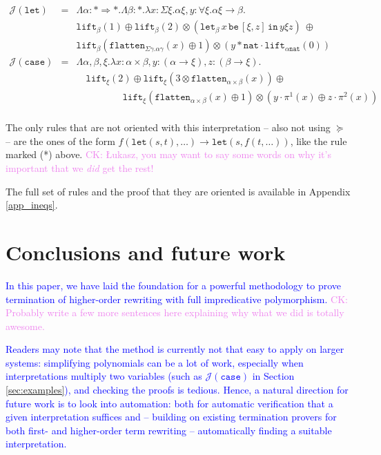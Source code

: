 \documentclass[a4paper,UKenglish,cleveref,autoref,numberwithinsect]{lipics-v2019}
\theoremstyle{definition}
\newcommand{\arrkind}{\Rightarrow}
\newcommand{\arrtype}{\rightarrow}
\newcommand{\quant}[2]{\forall #1.#2}
\newcommand{\red}{\longrightarrow}
\newcommand{\nat}{\mathtt{nat}}
\newcommand{\flatten}{\mathtt{flatten}}
\newcommand{\lift}{\mathtt{lift}}
\newcommand{\Termmap}{\mathcal{J}}
\newcommand{\xlet}[4]{\mathtt{let}_{#1}\,#2\,\mathtt{be}\,[#3]\,\mathtt{in}\,#4}
\newcommand{\CK}[1]{\textcolor{violet}{CK: #1}}
\newcommand{\CKchange}[1]{\textcolor{blue}{#1}}
\begin{document}
\[
\begin{array}{rcl}
\Termmap(\mathtt{let}) & = & \Lambda \alpha : * \arrkind * . \Lambda \beta : * . \lambda x : \Sigma \xi . \alpha\xi,
  y : \quant{\xi}{\alpha\xi \arrtype \beta}. \\
  & & \lift_\beta(1) \oplus \lift_\beta(2) \otimes
    (\xlet{\beta}{x}{\xi,z}{y\xi z})\ \oplus \\
  & & \lift_\beta(\flatten_{\Sigma\gamma.\alpha\gamma}(x) \oplus 1)
    \otimes (y * \nat \cdot \lift_{\alpha\nat}(0)) \\
\Termmap(\mathtt{case}) & = & \Lambda \alpha,\beta,\xi . \lambda x :
  \alpha \times \beta, y : (\alpha \arrtype \xi), z : (\beta \arrtype
  \xi). \\
  & & \quad
  \lift_\xi(2) \oplus
  \lift_\xi(3 \otimes \flatten_{\alpha \times \beta}(x)) \oplus \\
  & & \quad\phantom{ABCDE}
  \lift_\xi(\flatten_{\alpha \times \beta}(x) \oplus 1)
    \otimes (y \cdot \pi^1(x) \oplus z \cdot \pi^2(x)) \\
\end{array}
\]

The only rules that are not oriented with this interpretation -- also
not using $\succeq$ -- are the ones of the form $f(\mathtt{let}(s,t),
\dots) \red \mathtt{let}(s,f(t,\dots))$, like the rule marked (*) above.
\CK{\L ukasz, you may want to say some words on why it's important
that we \emph{did} get the rest!}

The full set of rules and the proof that they are oriented is
available in Appendix \ref{app_ineqs}.

\section{Conclusions and future work}

\CKchange{In this paper, we have laid the foundation for a powerful methodology
to prove termination of higher-order rewriting with full impredicative
polymorphism.}
\CK{Probably write a few more sentences here explaining why what we did
is totally awesome.}

\CKchange{Readers may note that the method is currently not that easy to apply on
larger systems: simplifying polynomials can be a lot of work,
especially when interpretations multiply two variables (such as
$\Termmap(\mathtt{case})$ in Section \ref{sec:examples}), and checking
the proofs is tedious.  Hence, a natural direction for future work is
to look into automation: both for automatic verification that a given
interpretation suffices and -- building on existing termination provers
for both first- and higher-order term rewriting -- automatically finding
a suitable interpretation.}
\end{document}
